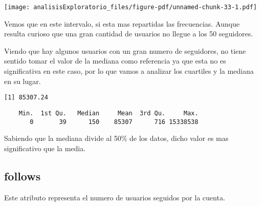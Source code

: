 \documentclass[
  letterpaper,
  DIV=11,
  numbers=noendperiod]{scrreprt}
\newenvironment{Shaded}{\begin{snugshade}}{\end{snugshade}}
\newcommand{\AttributeTok}[1]{\textcolor[rgb]{0.40,0.45,0.13}{#1}}
\newcommand{\FunctionTok}[1]{\textcolor[rgb]{0.28,0.35,0.67}{#1}}
\newcommand{\NormalTok}[1]{\textcolor[rgb]{0.00,0.23,0.31}{#1}}
\newcommand{\SpecialCharTok}[1]{\textcolor[rgb]{0.37,0.37,0.37}{#1}}
\newcommand{\StringTok}[1]{\textcolor[rgb]{0.13,0.47,0.30}{#1}}
\begin{document}
\texttt{[image: analisisExploratorio\_files/figure-pdf/unnamed-chunk-33-1.pdf]}

Vemos que en este intervalo, si esta mas repartidas las frecuencias.
Aunque resulta curioso que una gran cantidad de usuarios no llegue a los
50 seguidores.

Viendo que hay algunos usuarios con un gran numero de seguidores, no
tiene sentido tomar el valor de la mediana como referencia ya que esta
no es significativa en este caso, por lo que vamos a analizar los
cuartiles y la mediana en su lugar.

\begin{Shaded}
\end{Shaded}

\begin{verbatim}
[1] 85307.24
\end{verbatim}

\begin{Shaded}
\end{Shaded}

\begin{verbatim}
    Min.  1st Qu.   Median     Mean  3rd Qu.     Max. 
       0       39      150    85307      716 15338538 
\end{verbatim}

Sabiendo que la mediana divide al 50\% de los datos, dicho valor es mas
significativo que la media.

\subsection{follows}\label{follows}

Este atributo representa el numero de usuarios seguidos por la cuenta.

\begin{Shaded}
\end{Shaded}
\end{document}
